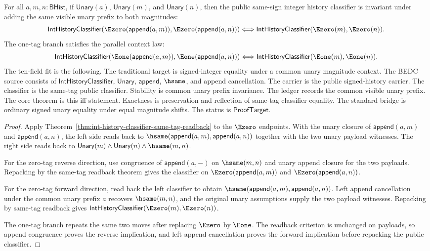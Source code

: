 \begin{theorem}
\label{thm:int-history-classifier-positive-append-context-iff}
For all $a,m,n:\mathsf{BHist}$, if $\mathsf{Unary}(a)$,
$\mathsf{Unary}(m)$, and $\mathsf{Unary}(n)$, then the public same-sign
integer history classifier is invariant under adding the same visible unary
prefix to both magnitudes:
$$
\mathsf{IntHistoryClassifier}(\Ezero(\mathsf{append}(a,m)),\Ezero(\mathsf{append}(a,n)))
\Longleftrightarrow
\mathsf{IntHistoryClassifier}(\Ezero(m),\Ezero(n)).
$$
The one-tag branch satisfies the parallel context law:
$$
\mathsf{IntHistoryClassifier}(\Eone(\mathsf{append}(a,m)),\Eone(\mathsf{append}(a,n)))
\Longleftrightarrow
\mathsf{IntHistoryClassifier}(\Eone(m),\Eone(n)).
$$
The ten-field fit is the following. The traditional target is signed-integer
equality under a common unary magnitude context. The BEDC source consists of
$\mathsf{IntHistoryClassifier}$, $\mathsf{Unary}$, $\mathsf{append}$,
$\hsame$, and append cancellation. The carrier is the public signed-history
carrier. The classifier is the same-tag public classifier. Stability is common
unary prefix invariance. The ledger records the common visible unary prefix.
The core theorem is this iff statement. Exactness is preservation and
reflection of same-tag classifier equality. The standard bridge is ordinary
signed unary equality under equal magnitude shifts. The status is
$\mathsf{ProofTarget}$.
\end{theorem}
\begin{proof}
Apply Theorem~\ref{thm:int-history-classifier-same-tag-readback} to the
$\Ezero$ endpoints. With the unary closure of
$\mathsf{append}(a,m)$ and $\mathsf{append}(a,n)$, the left side reads back to
$\hsame(\mathsf{append}(a,m),\mathsf{append}(a,n))$ together with the two
unary payload witnesses. The right side reads back to
$\mathsf{Unary}(m)\land\mathsf{Unary}(n)\land\hsame(m,n)$.

For the zero-tag reverse direction, use congruence of $\mathsf{append}(a,-)$
on $\hsame(m,n)$ and unary append closure for the two payloads. Repacking by
the same-tag readback theorem gives the classifier on
$\Ezero(\mathsf{append}(a,m))$ and $\Ezero(\mathsf{append}(a,n))$.

For the zero-tag forward direction, read back the left classifier to obtain
$\hsame(\mathsf{append}(a,m),\mathsf{append}(a,n))$. Left append cancellation
under the common unary prefix $a$ recovers $\hsame(m,n)$, and the original
unary assumptions supply the two payload witnesses. Repacking by same-tag
readback gives $\mathsf{IntHistoryClassifier}(\Ezero(m),\Ezero(n))$.

The one-tag branch repeats the same two moves after replacing $\Ezero$ by
$\Eone$. The readback criterion is unchanged on payloads, so append congruence
proves the reverse implication, and left append cancellation proves the
forward implication before repacking the public classifier.
\end{proof}

